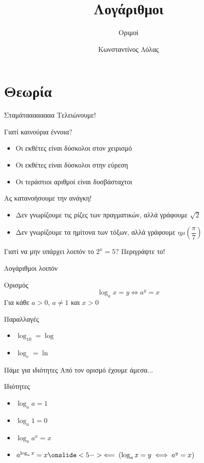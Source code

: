 \documentclass[greek]{beamer}
\title{Λογάριθμοι}
\subtitle{Οριμοί}
\author[Λόλας]{Κωνσταντίνος Λόλας}
\date{}
\begin{document}
\begin{frame}
 \titlepage
\end{frame}

\section{Θεωρία}
\begin{frame}{Σταμάταααααααα}
 Τελειώνουμε!
\end{frame}

\begin{frame}{Γιατί καινούρια έννοια?}
 \begin{itemize}
  \item<1-> Οι εκθέτες είναι δύσκολοι στον χειρισμό
  \item<2-> Οι εκθέτες είναι δύσκολοι στην εύρεση
  \item<3-> Οι τεράστιοι αριθμοί είναι δυσβάσταχτοι
 \end{itemize}
\end{frame}

\begin{frame}{Ας κατανοήσουμε την ανάγκη!}
 \begin{itemize}
  \item<1-> Δεν γνωρίζουμε τις ρίζες των πραγματικών, αλλά γράφουμε $\sqrt{2}$
  \item<2-> Δεν γνωρίζουμε τα ημίτονα των τόξων, αλλά γράφουμε $ημ(\dfrac{π}{7})$
 \end{itemize}
  Γιατί να μην υπάρχει λοιπόν το $2^x=5$? Περιγράψτε το!
\end{frame}

\begin{frame}[label=Θεωρία1]{Λογάριθμοι λοιπόν}
 \begin{block}{Ορισμός}
  $$\log_ax=y\iff a^y=x$$
  Για κάθε $a>0$, $a\ne 1$ και $x>0$
 \end{block}
 \begin{exampleblock}{Παραλλαγές}
  \begin{itemize}
   \item $\log_{10}=\log$
   \item $\log_e=\ln$
  \end{itemize}
 \end{exampleblock}
 \hyperlink{Άσκηση1}{}
\end{frame}

\begin{frame}{Πάμε για ιδιότητες}
 Από τον ορισμό έχουμε άμεσα...
 \begin{block}{Ιδιότητες}
  \begin{itemize}
   \item<1-> $\log_aa=1$
   \item<2-> $\log_a1=0$
   \item<3-> $\log_aa^x=x$
   \item<4-> $a^{\log_ax}=x \onslide<5-> \impliedby \left( \log_ax=y\iff a^y=x \right) $
  \end{itemize}
 \end{block}
\end{frame}
\end{document}
